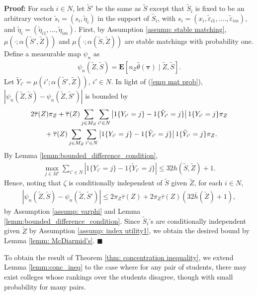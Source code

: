 \documentclass[12pt, fullpage]{amsart}
\theoremstyle{definition}
\theoremstyle{definition}
\theoremstyle{definition}
\begin{document}
\begin{bibunit}[econometrica]
\noindent \textbf{Proof: } For each $i \in N$, let $\tilde S'$ be the same as $\tilde S$ except that $\tilde S_i$ is fixed to be an arbitrary vector $\tilde s_i = (s_i, \tilde \eta_i)$ in the support of $\tilde S_i$, with $s_i =(x_i,\tilde \varepsilon_{i1},....,\tilde \varepsilon_{im})$, and $\tilde \eta_i = (\tilde \eta_{i1},...,\tilde \eta_{im})$. First, by Assumption \ref{assump: stable matching}, $\mu(\cdot; \alpha(\tilde S',\tilde Z))$ and $\mu(\cdot; \alpha(\tilde S,\tilde Z))$ are stable matchings with probability one. Define a measurable map $\psi_n$ as
\begin{align*}
	\psi_n(\tilde Z, \tilde S) = \mathbf{E}\left[n_Z \hat \theta(\boldsymbol{\tau}) \mid \tilde Z, \tilde S \right].
\end{align*}
Let $\tilde Y_{i'} = \mu(i'; \alpha(\tilde S',\tilde Z))$, $i' \in N$. In light of (\ref{emp mat prob}), $\left|\psi_n(\tilde Z, \tilde S) - \psi_n(\tilde Z, \tilde S') \right|$ is bounded by
\begin{align}
	\label{dev0}
    &2 \overline \tau(Z) \pi_Z + \overline \tau(Z) \sum_{j \in M_Z} \sum_{i' \in N} \left|1\{Y_{i'} = j\} - 1\{\tilde Y_{i'} = j\} \right|1\{Y_{i'} = j\} \pi_Z\\ \notag
    &\quad \quad + \overline \tau(Z) \sum_{j \in M_Z} \sum_{i' \in N} \left|1\{Y_{i'} = j\} - 1\{\tilde Y_{i'} = j\} \right|1\{\tilde Y_{i'} = j\} \pi_Z.
\end{align}    
By Lemma \ref{lemm:bounded_difference_condition},  
\begin{align*}
	\max_{j \in M'} \sum_{i' \in N} \left|1\{Y_{i'} = j\} - 1\{\tilde Y_{i'} = j\} \right| \le 32 h(\tilde S,\tilde Z) + 1.
\end{align*}
Hence, noting that $\zeta$ is conditionally independent of $\tilde S$ given $\tilde Z$, for each $i \in N$,
\begin{align}
	\label{dev}
	\left|\psi_n(\tilde Z, \tilde S) - \psi_n(\tilde Z, \tilde S') \right| \le 2\pi_Z \overline \tau(Z) + 2\pi_Z \overline \tau(Z) \left(32\overline h(\tilde Z)+1\right),
\end{align}
by Assumption \ref{assump: varphi} and Lemma \ref{lemm:bounded_difference_condition}.  Since $\tilde S_i$'s are conditionally independent given $\tilde Z$ by Assumption \ref{assump: index utility1}, we obtain the desired bound by Lemma \ref{lemm: McDiarmid's}. $\blacksquare$\medskip

To obtain the result of Theorem \ref{thm: concentration inequality}, we extend Lemma \ref{lemm:conc_ineq} to the case where for any pair of students, there may exist colleges whose rankings over the students disagree, though with small probability for many pairs.


\end{bibunit}
\end{document}
